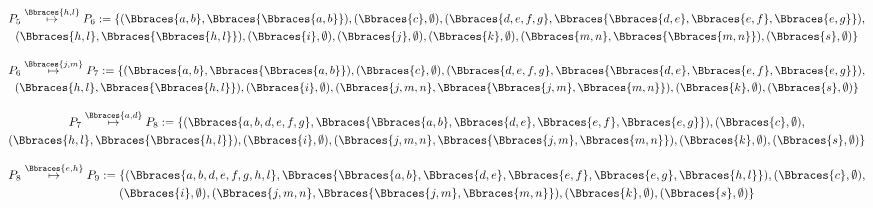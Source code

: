 \begin{solution}
\begin{enumerate}[label = \arabic*.]
    \begin{multline*}
        P_5
        \stackrel
        {
            \Bbraces{h, l}
        }{
            \mapsto
        }
        P_6 :=
        \{
            (\Bbraces{a, b}, \Bbraces{\Bbraces{a, b}}),
            (\Bbraces{c}, \emptyset),
            (\Bbraces{d, e, f, g}, \Bbraces{\Bbraces{d, e}, \Bbraces{e, f}, \Bbraces{e, g}}), \\
            (\Bbraces{h, l}, \Bbraces{\Bbraces{h, l}}),
            (\Bbraces{i}, \emptyset),
            (\Bbraces{j}, \emptyset),
            (\Bbraces{k}, \emptyset),
            (\Bbraces{m, n}, \Bbraces{\Bbraces{m, n}}),
            (\Bbraces{s}, \emptyset)
        \}
    \end{multline*}

    \begin{multline*}
        P_6
        \stackrel
        {
            \Bbraces{j, m}
        }{
            \mapsto
        }
        P_7 :=
        \{
            (\Bbraces{a, b}, \Bbraces{\Bbraces{a, b}}),
            (\Bbraces{c}, \emptyset),
            (\Bbraces{d, e, f, g}, \Bbraces{\Bbraces{d, e}, \Bbraces{e, f}, \Bbraces{e, g}}), \\
            (\Bbraces{h, l}, \Bbraces{\Bbraces{h, l}}),
            (\Bbraces{i}, \emptyset),
            (\Bbraces{j, m, n}, \Bbraces{\Bbraces{j, m}, \Bbraces{m, n}}),
            (\Bbraces{k}, \emptyset),
            (\Bbraces{s}, \emptyset)
        \}
    \end{multline*}

    \begin{multline*}
        P_7
        \stackrel
        {
            \Bbraces{a, d}
        }{
            \mapsto
        }
        P_8 :=
        \{
            (\Bbraces{a, b, d, e, f, g}, \Bbraces{\Bbraces{a, b}, \Bbraces{d, e}, \Bbraces{e, f}, \Bbraces{e, g}}),
            (\Bbraces{c}, \emptyset), \\
            (\Bbraces{h, l}, \Bbraces{\Bbraces{h, l}}),
            (\Bbraces{i}, \emptyset),
            (\Bbraces{j, m, n}, \Bbraces{\Bbraces{j, m}, \Bbraces{m, n}}),
            (\Bbraces{k}, \emptyset),
            (\Bbraces{s}, \emptyset)
        \}
    \end{multline*}

    \begin{multline*}
        P_8
        \stackrel
        {
            \Bbraces{e, h}
        }{
            \mapsto
        }
        P_9 :=
        \{
            (\Bbraces{a, b, d, e, f, g, h, l}, \Bbraces{\Bbraces{a, b}, \Bbraces{d, e}, \Bbraces{e, f}, \Bbraces{e, g}, \Bbraces{h, l}}),
            (\Bbraces{c}, \emptyset), \\
            (\Bbraces{i}, \emptyset),
            (\Bbraces{j, m, n}, \Bbraces{\Bbraces{j, m}, \Bbraces{m, n}}),
            (\Bbraces{k}, \emptyset),
            (\Bbraces{s}, \emptyset)
        \}
    \end{multline*}


\end{enumerate}
\end{solution}
